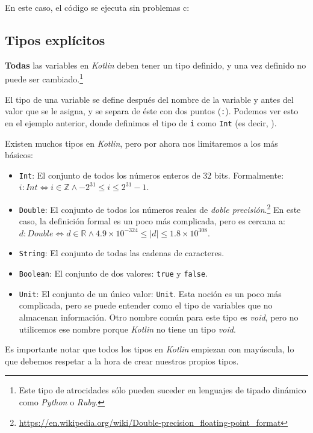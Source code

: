   En este caso, el código se ejecuta sin problemas c:

  \subsection{Tipos explícitos}
    \textbf{Todas} las variables en \textit{Kotlin} deben tener un tipo definido, y una vez definido no puede
    ser cambiado.\footnote{Este tipo de atrocidades sólo pueden suceder en lenguajes de tipado
    dinámico como \textit{Python} o \textit{Ruby}.}
    
    El tipo de una variable se define después del nombre de la variable y antes del valor que se le
    asigna, y se separa de éste con dos puntos (\texttt{:}).
    Podemos ver esto en el ejemplo anterior, donde definimos el tipo de \texttt{i} como 
    \texttt{Int} (es decir, ).

    Existen muchos tipos en \textit{Kotlin}, pero por ahora nos limitaremos a los más básicos:
    
    \begin{itemize}
      \item \texttt{Int}: El conjunto de todos los números enteros de 32 bits. 
        Formalmente: \(i: Int \iff i \in \mathbb{Z} \land -2^{31} \leq i \leq 2^{31} - 1\).
      \item \texttt{Double}: El conjunto de todos los números reales de \textit{doble 
        precisión}.\footnote{\url{https://en.wikipedia.org/wiki/Double-precision_floating-point_format}}
        En este caso, la definición formal es un poco más complicada, pero es cercana a:
        \(d: Double \iff d \in \mathbb{R} \land 4.9 \times 10^{-324} \leq |d| \leq 1.8 \times 10^{308}\).
      \item \texttt{String}: El conjunto de todas las cadenas de caracteres.
      \item \texttt{Boolean}: El conjunto de dos valores: \texttt{true} y \texttt{false}.
      \item \texttt{Unit}: El conjunto de un único valor: \texttt{Unit}.
        Esta noción es un poco más complicada, pero se puede entender como el tipo de variables que
        no almacenan información.
        Otro nombre común para este tipo es \textit{void}, pero no utilicemos ese nombre porque
        \textit{Kotlin} no tiene un tipo \textit{void}.
    \end{itemize}

    Es importante notar que todos los tipos en \textit{Kotlin} empiezan con mayúscula, lo que 
    debemos respetar a la hora de crear nuestros propios tipos.

